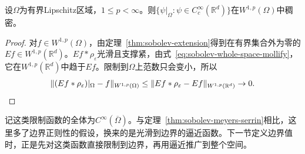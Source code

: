 \begin{theorem}[光滑到边界的逼近]
\label{thm:sobolev-smooth-up-to-boundary}
设$\Omega$为有界Lipschitz区域，$1\leq p<\infty$。则$\{\psi|_\Omega:\psi\in C_c^\infty(\mathbb R^d)\}$在$W^{1,p}(\Omega)$中稠密。
\end{theorem}

\begin{proof}
对$f\in W^{1,p}(\Omega)$，由定理~\ref{thm:sobolev-extension}得到在有界集合外为零的$Ef\in W^{1,p}(\mathbb R^d)$。$Ef*\rho_\varepsilon$光滑且支撑紧，由式~\eqref{eq:sobolev-whole-space-mollify}，它在$W^{1,p}(\mathbb R^d)$中趋于$Ef$。限制到$\Omega$上范数只会变小，所以
\[
\lVert(Ef*\rho_\varepsilon)|_\Omega-f\rVert_{W^{1,p}(\Omega)}
\leq\lVert Ef*\rho_\varepsilon-Ef\rVert_{W^{1,p}(\mathbb R^d)}\to0.
\qedhere
\]
\end{proof}

记这类限制函数的全体为$C^\infty(\overline\Omega)$。与定理~\ref{thm:sobolev-meyers-serrin}相比，这里多了边界正则性的假设，换来的是光滑到边界的逼近函数。下一节定义边界值时，正是先对这类函数直接限制到边界，再用逼近推广到整个空间。
